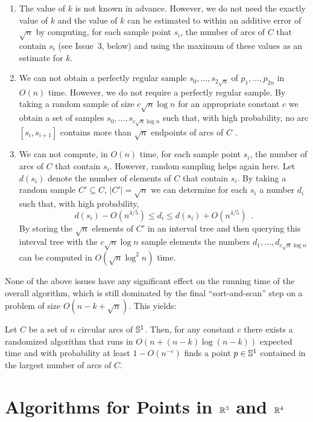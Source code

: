 \documentclass[charterfonts,lotsofwhite]{patmorin}
\begin{document}
\begin{enumerate}

\item The value of $k$ is not known in advance.  However, we do not
need the exactly value of $k$ and the value of $k$ can be estimated to
within an additive error of $\sqrt{n}$ by computing, for each sample
point $s_i$, the number of arcs of $C$ that contain $s_i$ (see
Issue~3, below) and using the maximum of these values as an estimate
for $k$.

\item We can not obtain a perfectly regular sample
$s_0,\ldots,s_{2\sqrt{n}}$ of $p_1,\ldots,p_{2n}$ in $O(n)$ time.
However, we do not require a perfectly regular sample.  By taking a
random sample of size $c\sqrt{n}\log n$ for an appropriate constant
$c$ we obtain a set of samples $s_0,\ldots,s_{c\sqrt{n}\log n}$ such
that, with high probability, no arc $[s_{i},s_{i+1}]$ contains more
than $\sqrt{n}$ endpoints of arcs of $C$ \cite{m98}.

\item We can not compute, in $O(n)$ time, for each sample point $s_i$,
the number of arcs of $C$ that contain $s_i$.  However, random
sampling helps again here.  Let $d(s_i)$ denote the number of elements
of $C$ that contain $s_i$. By taking a random sample $C'\subseteq C$,
$|C'|=\sqrt{n}$ we can determine for each $s_i$ a
number $d_i$ such that, with high probability,
\[
        d(s_i) - O(n^{4/5})\le d_i \le
           d(s_i) + O(n^{4/5}) \enspace .
\]
By storing the $\sqrt{n}$ elements of $C'$ in an interval tree \cite{ps85} and
then querying this interval tree with the $c\sqrt{n}\log n$ sample
elements the numbers $d_1,\ldots,d_{c\sqrt{n}\log n}$ can be computed
in $O(\sqrt{n}\log^2 n)$
time.  
\end{enumerate}

None of the above issues have any significant effect on the running
time of the overall algorithm, which is still dominated by the final
``sort-and-scan'' step on a problem of size $O(n-k+\sqrt{n})$.  This
yields:

\begin{thm}
Let
$C$ be a set of $n$ circular arcs of $\mathbb{S}^1$.  Then, for any constant
$c$ there exists a randomized algorithm that runs in $O(n+(n-k)\log
(n-k))$ expected time and with probability at least $1-O(n^{-c})$
finds a point $p\in\mathbb{S}^1$ contained in the largest number of arcs of
$C$.
\end{thm}


\section{Algorithms for Points in $\mathbb{R}^3$ and $\mathbb{R}^4$}
\end{document}

